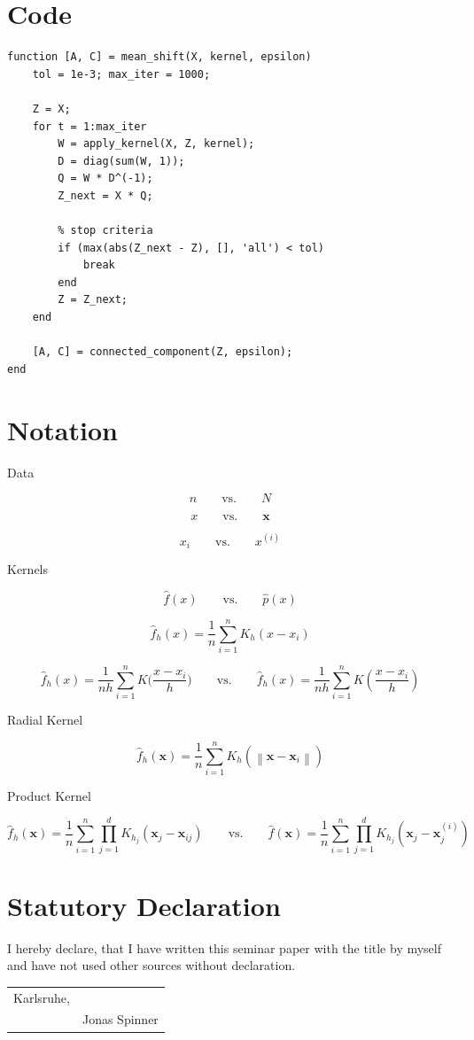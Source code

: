 \documentclass{article}
\newcommand{\norm}[1]{\left\lVert#1\right\rVert}
\begin{document}




\appendix


\section{Code}

\begin{lstlisting}
function [A, C] = mean_shift(X, kernel, epsilon)
    tol = 1e-3; max_iter = 1000;
	
    Z = X;
    for t = 1:max_iter        
        W = apply_kernel(X, Z, kernel);
        D = diag(sum(W, 1));
        Q = W * D^(-1);
        Z_next = X * Q;

        % stop criteria
        if (max(abs(Z_next - Z), [], 'all') < tol)
            break
        end
    	Z = Z_next;
    end

    [A, C] = connected_component(Z, epsilon);
end
\end{lstlisting}


\section{Notation}

Data

\[
n\qquad \text{vs.} \qquad N
\]

\[
x\qquad \text{vs.} \qquad \bm{x}
\]

\[
x_i\qquad \text{vs.} \qquad x^{(i)}
\]

Kernels

\[
\hat{f}(x)\qquad \text{vs.} \qquad \hat{p}(x)
\]

\[
\hat{f}_h(x) = \frac{1}{n} \sum_{i=1}^n K_h(x - x_i)
\]

\[
\hat{f}_h(x) = \frac{1}{nh} \sum_{i=1}^n K\biggl(\frac{x - x_i}{h}\biggr)\qquad \text{vs.} \qquad \hat{f}_h(x) = \frac{1}{nh} \sum_{i=1}^n K\left(\frac{x - x_i}{h}\right)
\]

Radial Kernel

\[
\hat{f}_h(\bm{x}) = \frac{1}{n} \sum_{i=1}^{n} K_h(\norm{\bm{x} -\bm{x}_i})
\]

Product Kernel

\[
\hat{f}_h(\bm{x}) = \frac{1}{n} \sum_{i=1}^{n} \prod_{j=1}^d K_{h_j}(\bm{x}_j -\bm{x}_{ij})\qquad \text{vs.} \qquad \hat{f}(\bm{x}) = \frac{1}{n} \sum_{i=1}^{n} \prod_{j=1}^d K_{h_j}(\bm{x}_j -\bm{x}_j^{(i)})
\]

\newpage
\section*{Statutory Declaration}

I hereby declare, that I have written this seminar paper with the title \textbf{\thetitle} by myself and have not used other sources without declaration.


\begin{tabular}{@{}p{2in}p{2.5in}@{}}
	Karlsruhe, \thedate & \hrulefill \\
	& Jonas Spinner
\end{tabular}
\end{document}
